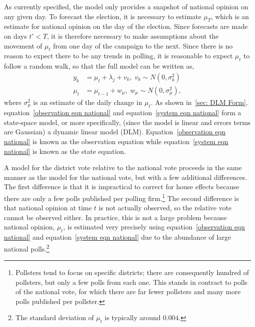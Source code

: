 \documentclass[12pt,final,fleqn]{article}
\theoremstyle{plain}
\begin{document}
As currently specified, the model only provides a snapshot of national opinion on any given day. To forecast the election, it is necessary to estimate $\mu_T$, which is an estimate for national opinion on the day of the election. Since forecasts are made on days $t' <T$, it is therefore necessary to make assumptions about the movement of $\mu_t$ from one day of the campaign to the next. Since there is no reason to expect there to be any trends in polling, it is reasonable to expect $\mu_t$ to follow a random walk, so that the full model can be written as,
\begin{align}
\label{observation eqn national}
y_k &= \mu_{t} + \lambda_{j} + v_k, \; v_k\sim N(0, \sigma^2_k)\\ 
\label{system eqn national}
\mu_{t} &= \mu_{t-1} + w_\mu, \; w_\mu \sim N(0, \sigma^2_{\mu}),
\end{align}
where $\sigma^2_\mu$ is an estimate of the daily change in $\mu_t$. As shown in~\autoref{sec: DLM Form}, equation~\ref{observation eqn national} and equation~\ref{system eqn national} form a state-space model, or more specifically, (since the model is linear and errors terms are Gaussian) a dynamic linear model (DLM). Equation~\ref{observation eqn national} is known as the observation equation while equation~\ref{system eqn national} is known as the state equation. 

A model for the district vote relative to the national vote proceeds in the same manner as the model for the national vote, but with a few additional differences. The first difference is that it is impractical to correct for house effects because there are only a few polls published per polling firm.\footnote{Pollsters tend to focus on specific districts; there are consequently hundred of pollsters, but only a few polls from each one. This stands in contract to polls of the national vote, for which there are far fewer pollsters and many more polls published per pollster.} The second difference is that national opinion at time $t$ is not actually observed, so the relative vote cannot be observed either. In practice, this is not a large problem because national opinion, $\mu_t$, is estimated very precisely using equation~\ref{observation eqn national} and equation~\ref{system eqn national} due to the abundance of large national polls.\footnote{The standard deviation of $\mu_t$ is typically around $0.004$.}
\end{document}
